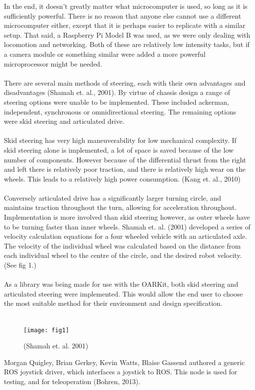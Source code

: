 \documentclass[]{article}
\begin{document}
In the end, it doesn't greatly matter what microcomputer is used, so long as it is sufficiently powerful. There is no reason that anyone else cannot use a different microcomputer either, except that it is perhaps easier to replicate with a similar setup. That said, a Raspberry Pi Model B was used, as we were only dealing with locomotion and networking. Both of these are relatively low intensity tasks, but if a camera module or something similar were added a more powerful microprocessor might be needed.
\\
\\
There are several main methods of steering, each with their own advantages and disadvantages (Shamah et. al., 2001). By virtue of chassis design a range of steering options were unable to be implemented. These included ackerman, independent, synchronous or omnidirectional steering. The remaining options were skid steering and articulated drive.
\\
\\
Skid steering has very high maneuverability for low mechanical complexity. If skid steering alone is implemented, a lot of space is saved because of the low number of components. However because of the differential thrust from the right and left there is relatively poor traction, and there is relatively high wear on the wheels. This leads to a relatively high power consumption. (Kang et. al., 2010)
\\
\\
Conversely articulated drive has a significantly larger turning circle, and  maintains traction throughout the turn, allowing for acceleration throughout. Implementation is more involved than skid steering however, as outer wheels have to be turning faster than inner wheels. Shamah et. al. (2001) developed a series of velocity calculation equations for a four wheeled vehicle with an articulated axle. The velocity of the individual wheel was calculated based on the distance from each individual wheel to the centre of the circle, and the desired robot velocity. (See fig 1.)
\\
\\
As a library was being made for use with the OARKit, both skid steering and articulated steering were implemented. This would allow the end user to choose the most suitable method for their environment and design specification.
\\
\\
\begin{figure}
\texttt{[image: fig1]}
\caption{(Shamah et. al. 2001)}
\end{figure}
Morgan Quigley, Brian Gerkey, Kevin Watts, Blaise Gassend authored a generic ROS joystick driver, which interfaces a joystick to ROS. This node is used for testing, and for teleoperation (Bohren, 2013).
\end{document}
